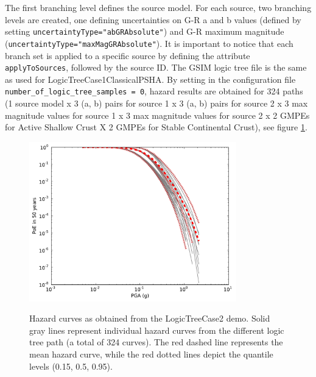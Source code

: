 The first branching level defines the source model. For each source, 
two branching levels are created, one defining
uncertainties on G-R a and b values (defined by setting 
\texttt{uncertaintyType="abGRAbsolute"}) and G-R maximum
magnitude (\texttt{uncertaintyType="maxMagGRAbsolute"}). 
%
It is important to notice that each branch set is applied
to a specific source by defining the attribute \texttt{apply\-To\-Sources}, 
followed by the source ID. The GSIM logic tree file is
the same as used for LogicTreeCase1ClassicalPSHA. By setting in the 
configuration file \texttt{number\_\-of\_\-logic\_\-tree\_\-samples = 0},
hazard results are obtained for 324 paths (1 source model x 3 (a, b) 
pairs for source 1 x  3 (a, b) pairs for source 2 x 3 max magnitude values
for source 1 x 3 max magnitude values for source 2 x 2 GMPEs for Active 
Shallow Crust X 2 GMPEs for Stable Continental Crust), see
figure \ref{fig:hazard_curves}.\\

\begin{figure}
\centering
\subcaptionbox{}
{\includegraphics[width=9cm]{./figures/hazard/hazard-curves-ltcase2.pdf}} 
\caption{Hazard curves as obtained from the LogicTreeCase2 demo. Solid gray 
    lines represent individual hazard curves from the different
    logic tree path (a total of 324 curves). The red dashed line represents the
    mean hazard curve, while the red dotted lines depict the quantile levels
    (0.15, 0.5, 0.95).}
\label{fig:hazard_curves}
\end{figure}

